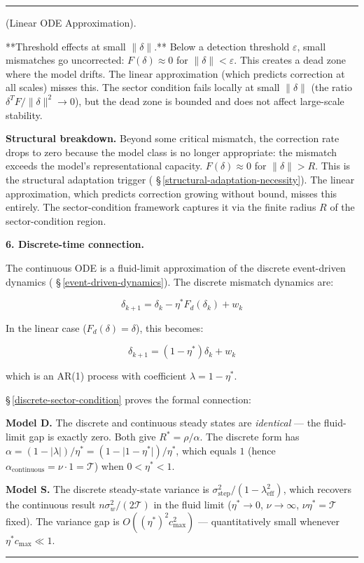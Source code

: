 \documentclass[11pt,oneside]{article}
\newcounter{claim}[section]
\renewcommand{\theclaim}{\thesection.\arabic{claim}}
\newenvironment{segment}[2]{%
  \refstepcounter{claim}%
  \bigskip\noindent\hrule\smallskip
  \noindent{\bfseries #1~\theclaim}\enskip(#2).\par\smallskip
  \noindent\ignorespaces
}{%
  \par\smallskip\noindent\hrule\bigskip
}
\newenvironment{detail}[1][]{\begin{segment}{Detail}{#1}}{\end{segment}}
\begin{document}
\begin{detail}[Linear ODE Approximation]
**Threshold effects at small $\lVert\delta\rVert$.** Below a detection threshold $\varepsilon$, small mismatches go uncorrected: $F(\delta) \approx 0$ for $\lVert\delta\rVert < \varepsilon$. This creates a dead zone where the model drifts. The linear approximation (which predicts correction at all scales) misses this. The sector condition fails locally at small $\lVert\delta\rVert$ (the ratio $\delta^T F / \lVert\delta\rVert^2 \to 0$), but the dead zone is bounded and does not affect large-scale stability.

\textbf{Structural breakdown.} Beyond some critical mismatch, the correction rate drops to zero because the model class is no longer appropriate: the mismatch exceeds the model's representational capacity. $F(\delta) \approx 0$ for $\lVert\delta\rVert > R$. This is the structural adaptation trigger ( \S\,\ref{structural-adaptation-necessity}). The linear approximation, which predicts correction growing without bound, misses this entirely. The sector-condition framework captures it via the finite radius $R$ of the sector-condition region.


\medskip\noindent\textbf{6. Discrete-time connection.}


The continuous ODE is a fluid-limit approximation of the discrete event-driven dynamics ( \S\,\ref{event-driven-dynamics}). The discrete mismatch dynamics are:

$$\delta_{k+1} = \delta_k - \eta^* F_d(\delta_k) + w_k$$

In the linear case ($F_d(\delta) = \delta$), this becomes:

$$\delta_{k+1} = (1 - \eta^*)\delta_k + w_k$$

which is an AR(1) process with coefficient $\lambda = 1 - \eta^*$.

\S\,\ref{discrete-sector-condition} proves the formal connection:

\textbf{Model D.} The discrete and continuous steady states are \textit{identical} — the fluid-limit gap is exactly zero. Both give $R^* = \rho/\alpha$. The discrete form has $\alpha = (1 - \lvert\lambda\rvert)/\eta^* = (1 - \lvert 1 - \eta^*\rvert)/\eta^*$, which equals $1$ (hence $\alpha_{\text{continuous}} = \nu \cdot 1 = \mathcal{T}$) when $0 < \eta^* < 1$.

\textbf{Model S.} The discrete steady-state variance is $\sigma^2_{\text{step}} / (1 - \lambda^2_{\text{eff}})$, which recovers the continuous result $n\sigma_w^2/(2\mathcal{T})$ in the fluid limit ($\eta^* \to 0$, $\nu \to \infty$, $\nu\eta^* = \mathcal{T}$ fixed). The variance gap is $O((\eta^*)^2 c^2_{\max})$ — quantitatively small whenever $\eta^* c_{\max} \ll 1$.


\end{detail}
\end{document}
